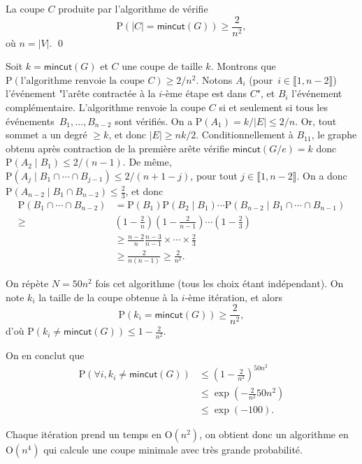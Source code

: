 \documentclass[./main]{subfiles}
\begin{document}
  \begin{lem}
    La coupe $C$ produite par l'algorithme de vérifie 
    \[
    \mathrm{P}(|C| = \mathsf{mincut}(G)) \ge \frac{2}{n^2}
    ,\] où $n = |V|$.
    \qed
  \end{lem}
  \begin{prv}
    Soit $k = \mathsf{mincut}(G)$ et $C$ une coupe de taille $k$.
    Montrons que $\mathrm{P}(\text{l'algorithme renvoie la coupe } C) \ge 2 / n^2$.
    Notons $A_i$ (pour~$i \in \llbracket 1,n-2\rrbracket$) l'événement "l'arête contractée à la $i$-ème étape est dans $C$", et $B_i$ l'événement complémentaire.
    L'algorithme renvoie la coupe $C$ si et seulement si tous les événements~$B_1, \ldots, B_{n-2}$ sont vérifiés.
    On a $\mathrm{P}(A_1) = k / |E| \le 2 / n$. Or, tout sommet a un degré $\ge k$, et donc $|E| \ge n k / 2$.
    Conditionnellement à $B_{11}$, le graphe obtenu après contraction de la première arête vérifie $\mathsf{mincut}(G / e) = k$ donc $\mathrm{P}(A_2  \mid B_1) \le 2 / (n-1)$.
    De même, $\mathrm{P}(A_j  \mid B_1 \cap \cdots \cap B_{j-1}) \le 2 / (n + 1 - j)$, pour tout $j \in \llbracket 1, n-2\rrbracket$.
    On a donc $\mathrm{P}(A_{n-2}  \mid B_1 \cap B_{n-2}) \le \frac{2}{3}$, et donc
    \begin{align*}
      \mathrm{P}(B_1 \cap \cdots \cap B_{n-2}) &= \mathrm{P}(B_1) \mathrm{P}(B_2  \mid B_1) \cdots \mathrm{P}(B_{n-2}  \mid B_1 \cap \cdots \cap B_{n-1})\\
      \ge & \left( 1 - \frac{2}{n}\right) \left( 1 - \frac{2}{n-1}\right) \cdots \left( 1 - \frac{2}{3}\right)\\
          &\ge \frac{n-2}{n} \frac{n-3}{n-1} \times \cdots \times \frac{2}{3}\\
          &\ge \frac{2}{n(n-1)} \ge \frac{2}{n^2}
    .\end{align*}
  \end{prv}

  \begin{exm}
    On répète $N = 50 n^2$ fois cet algorithme (tous les choix étant indépendant).
    On note $k_i$ la taille de la coupe obtenue à la $i$-ème itération, et alors
    \[
    \mathrm{P}(k_i = \mathsf{mincut}(G)) \ge \frac{2}{n^2}
    ,\] d'où $\mathrm{P}(k_i \neq \mathsf{mincut}(G)) \le 1 -  \frac{2}{n^2}$.

    On en conclut que
    \begin{align*}
      \mathrm{P}(\forall i, k_i \neq \mathsf{mincut}(G)) &\le \left( 1 - \frac{2}{n^2} \right)^{50n^2}\\
                                                         &\le \exp\left(-\frac{2}{n^2} 50n^2\right)\\
                                                         &\le \exp(-100)
    .\end{align*}

    Chaque itération prend un temps en $\mathrm{O}(n^2)$, on obtient donc un algorithme en $\mathrm{O}(n^4)$ qui calcule une coupe minimale avec très grande probabilité.
  \end{exm}
\end{document}
